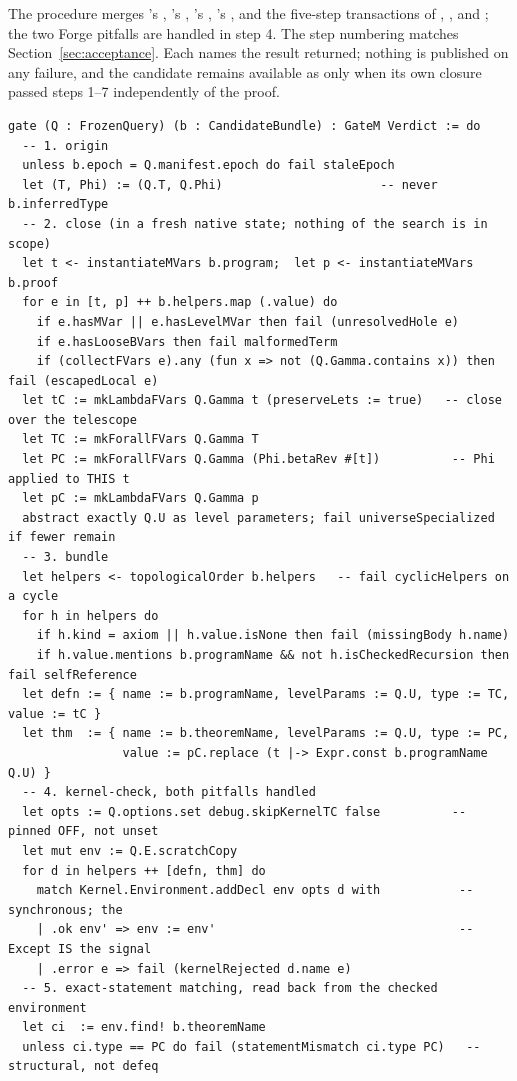 The procedure merges 's , 's , 's , 's , and the five-step transactions of , , and ; the two Forge pitfalls are handled in step 4. The step numbering matches Section~\ref{sec:acceptance}. Each  names the result returned; nothing is published on any failure, and the candidate remains available as  only when its own closure passed steps 1--7 independently of the proof.
\begin{lstlisting}
gate (Q : FrozenQuery) (b : CandidateBundle) : GateM Verdict := do
  -- 1. origin
  unless b.epoch = Q.manifest.epoch do fail staleEpoch
  let (T, Phi) := (Q.T, Q.Phi)                      -- never b.inferredType
  -- 2. close (in a fresh native state; nothing of the search is in scope)
  let t <- instantiateMVars b.program;  let p <- instantiateMVars b.proof
  for e in [t, p] ++ b.helpers.map (.value) do
    if e.hasMVar || e.hasLevelMVar then fail (unresolvedHole e)
    if e.hasLooseBVars then fail malformedTerm
    if (collectFVars e).any (fun x => not (Q.Gamma.contains x)) then fail (escapedLocal e)
  let tC := mkLambdaFVars Q.Gamma t (preserveLets := true)   -- close over the telescope
  let TC := mkForallFVars Q.Gamma T
  let PC := mkForallFVars Q.Gamma (Phi.betaRev #[t])          -- Phi applied to THIS t
  let pC := mkLambdaFVars Q.Gamma p
  abstract exactly Q.U as level parameters; fail universeSpecialized if fewer remain
  -- 3. bundle
  let helpers <- topologicalOrder b.helpers   -- fail cyclicHelpers on a cycle
  for h in helpers do
    if h.kind = axiom || h.value.isNone then fail (missingBody h.name)
    if h.value.mentions b.programName && not h.isCheckedRecursion then fail selfReference
  let defn := { name := b.programName, levelParams := Q.U, type := TC, value := tC }
  let thm  := { name := b.theoremName, levelParams := Q.U, type := PC,
                value := pC.replace (t |-> Expr.const b.programName Q.U) }
  -- 4. kernel-check, both pitfalls handled
  let opts := Q.options.set debug.skipKernelTC false          -- pinned OFF, not unset
  let mut env := Q.E.scratchCopy
  for d in helpers ++ [defn, thm] do
    match Kernel.Environment.addDecl env opts d with           -- synchronous; the
    | .ok env' => env := env'                                  -- Except IS the signal
    | .error e => fail (kernelRejected d.name e)
  -- 5. exact-statement matching, read back from the checked environment
  let ci  := env.find! b.theoremName
  unless ci.type == PC do fail (statementMismatch ci.type PC)   -- structural, not defeq

\end{lstlisting}
